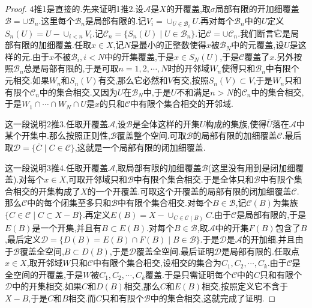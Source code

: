 \begin{proof}
	
	4推1是直接的.先来证明1推2.设$\mathscr{A}$是$X$的开覆盖,取$\sigma$局部有限的开加细覆盖$\mathscr{B}=\cup\mathscr{B}_n$.这里每个$\mathscr{B}_n$是局部有限的.记$V_i=\cup_{U\in\mathscr{B}_i}U$.再对每个$\mathscr{B}_n$中的$U$定义$S_n(U)=U-\cup_{i<n}V_i$.记$\mathscr{C}_n=\{S_n(U)\mid U\in\mathscr{B}_n\}$.记$\mathscr{C}=\cup\mathscr{C}_n$.我们断言它是局部有限的加细覆盖.任取$x\in X$,记$N$是最小的正整数使得$x$被$\mathscr{B}_N$中的元覆盖,设$U$是这样的元.由于$x$不被$\mathscr{B}_i,i<N$中的开集覆盖,于是$x\in S_N(U)$,于是$\mathscr{C}$覆盖了$x$.另外按照$\mathscr{B}_n$总是局部有限的,于是可取$n=1,2,\cdots,N$时的开邻域$W_n$使得只和$\mathscr{B}_n$中有限个元相交.如果$W_n$和$S_n(V)$有交,那么它必然和$V$有交,按照$S_n(V)\subset V$,于是$W_n$只和有限个$\mathscr{C}_n$中的集合相交.又因为$U$在$\mathscr{B}_N$中,于是$U$不和满足$n>N$的$\mathscr{C}_n$中的集合相交,于是$W_1\cap\cdots\cap W_N\cap U$是$x$的只和$\mathscr{C}$中有限个集合相交的开邻域.
	
	这一段说明2推3.任取开覆盖$\mathscr{A}$,设$\mathscr{B}$是全体这样的开集$U$构成的集族,使得$\overline{U}$落在$\mathscr{A}$中某个开集中.那么按照正则性,$\mathscr{B}$覆盖整个空间.可取$\mathscr{B}$的局部有限的加细覆盖$\mathscr{C}$.最后取$\mathscr{D}=\{\overline{C}\mid C\in\mathscr{C}\}$,这就是一个局部有限的闭加细覆盖.
	
	这一段说明3推4.任取开覆盖$\mathscr{A}$,取局部有限的加细覆盖$\mathscr{B}$(这里没有用到是闭加细覆盖).对每个$x\in X$,可取开邻域只和$\mathscr{B}$中有限个集合相交.于是全体只和$\mathscr{B}$中有限个集合相交的开集构成了$X$的一个开覆盖.可取这个开覆盖的局部有限的闭加细覆盖$\mathscr{C}$.那么$\mathscr{C}$中的每个闭集至多只和$\mathscr{B}$中有限个集合相交.对每个$B\in\mathscr{B}$,记$\mathscr{C}(B)$为集族$\{C\in\mathscr{C}\mid C\subset X-B\}$.再定义$E(B)=X-\cup_{C\in\mathscr{C}(B)}C$.由于$\mathscr{C}$是局部有限的,于是$E(B)$是一个开集,并且有$B\subset E(B)$.对每个$B\in\mathscr{B}$,取$\mathscr{A}$中的开集$F(B)$包含了$B$,最后定义$\mathscr{D}=\{D(B)=E(B)\cap F(B)\mid B\in\mathscr{B}\}$.于是$\mathscr{D}$是$\mathscr{A}$的开加细.并且由于$\mathscr{B}$覆盖全空间,$B\subset D(B)$,于是$\mathscr{D}$覆盖全空间.最后证明$\mathscr{D}$是局部有限的.任取点$x\in X$,取开邻域$W$只和$\mathscr{C}$中有限个集合相交,设相交的集合为$C_1,C_2,\cdots,C_k$.由于$\mathscr{C}$是全空间的开覆盖,于是$W$被$C_1,C_2,\cdots,C_k$覆盖.于是只需证明每个$\mathscr{C}$中的$C$只和有限个$\mathscr{D}$中的开集相交.如果$C$和$D(B)$相交,那么$C$和$E(B)$相交,按照定义它不含于$X-B$,于是$C$和$B$相交.而$C$只和有限个$\mathscr{B}$中的集合相交,这就完成了证明.
\end{proof}

